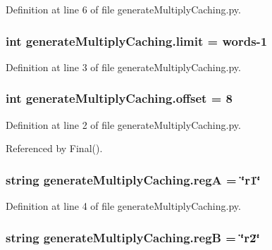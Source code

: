Definition at line 6 of file generate\-Multiply\-Caching.\-py.

\hypertarget{namespacegenerateMultiplyCaching_a64538443690647d2497d626760c41562}{
\subsubsection[{limit}]{\setlength{\rightskip}{0pt plus 5cm}int generate\-Multiply\-Caching.\-limit = {\bf words}-\/1}}\label{namespacegenerateMultiplyCaching_a64538443690647d2497d626760c41562}


Definition at line 3 of file generate\-Multiply\-Caching.\-py.

\hypertarget{namespacegenerateMultiplyCaching_ae17a49f63b03ec0ce742c9967dd8d837}{
\subsubsection[{offset}]{\setlength{\rightskip}{0pt plus 5cm}int generate\-Multiply\-Caching.\-offset = 8}}\label{namespacegenerateMultiplyCaching_ae17a49f63b03ec0ce742c9967dd8d837}


Definition at line 2 of file generate\-Multiply\-Caching.\-py.



Referenced by Final().

\hypertarget{namespacegenerateMultiplyCaching_a472c103812db99ab3f4a433460c9d4e0}{
\subsubsection[{reg\-A}]{\setlength{\rightskip}{0pt plus 5cm}string generate\-Multiply\-Caching.\-reg\-A = \char`\"{}r1\char`\"{}}}\label{namespacegenerateMultiplyCaching_a472c103812db99ab3f4a433460c9d4e0}


Definition at line 4 of file generate\-Multiply\-Caching.\-py.

\hypertarget{namespacegenerateMultiplyCaching_a888dd26c3a59e11fb419a68cf3e0ca72}{
\subsubsection[{reg\-B}]{\setlength{\rightskip}{0pt plus 5cm}string generate\-Multiply\-Caching.\-reg\-B = \char`\"{}r2\char`\"{}}}\label{namespacegenerateMultiplyCaching_a888dd26c3a59e11fb419a68cf3e0ca72}


